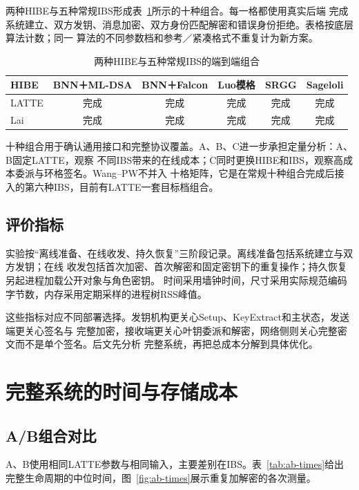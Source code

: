 两种HIBE与五种常规IBS形成表~\ref{tab:ten-combinations}所示的十种组合。每一格都使用真实后端
完成系统建立、双方发钥、消息加密、双方身份匹配解密和错误身份拒绝。表格按底层算法计数；同一
算法的不同参数档和参考／紧凑格式不重复计为新方案。

\begin{table}[H]
\centering\small
\caption{两种HIBE与五种常规IBS的端到端组合}
\label{tab:ten-combinations}
\begin{tabular}{@{}lccccc@{}}
\toprule
\rowcolor{black!8} HIBE & BNN＋ML-DSA & BNN＋Falcon & Luo模格 & SRGG & Sageloli \\
\midrule
LATTE & 完成 & 完成 & 完成 & 完成 & 完成 \\
Lai & 完成 & 完成 & 完成 & 完成 & 完成 \\
\bottomrule
\end{tabular}
\end{table}

十种组合用于确认通用接口和完整协议覆盖。A、B、C进一步承担定量分析：A、B固定LATTE，观察
不同IBS带来的在线成本；C同时更换HIBE和IBS，观察高成本委派与环格签名。Wang--PW不并入
十格矩阵，它是在常规十种组合完成后接入的第六种IBS，目前有LATTE一套目标档组合。

\subsection{评价指标}

实验按“离线准备、在线收发、持久恢复”三阶段记录。离线准备包括系统建立与双方发钥；在线
收发包括首次加密、首次解密和固定密钥下的重复操作；持久恢复另起进程加载公开对象与角色密钥。
时间采用墙钟时间，尺寸采用实际规范编码字节数，内存采用定期采样的进程树RSS峰值。

这些指标对应不同部署选择。发钥机构更关心Setup、KeyExtract和主状态，发送端更关心签名与
完整加密，接收端更关心叶钥委派和解密，网络侧则关心完整密文而不是单个签名。后文先分析
完整系统，再把总成本分解到具体优化。

\section{完整系统的时间与存储成本}
\subsection{A/B组合对比}
A、B使用相同LATTE参数与相同输入，主要差别在IBS。表~\ref{tab:ab-times}给出完整生命周期的中位时间，图~\ref{fig:ab-times}展示重复加解密的各次测量。

